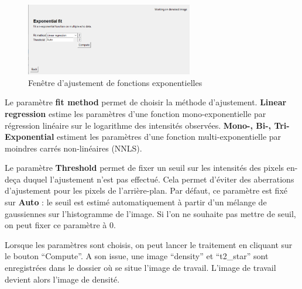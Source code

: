 \documentclass[french]{article}
\begin{document}
\begin{figure}[ht]
  \centering \includegraphics[width=0.65\textwidth]{fig/expfit}
  \caption{Fenêtre d'ajustement de fonctions exponentielles}
  \label{fig:expfit}
\end{figure}



Le paramètre \textbf{fit method} permet de choisir la méthode
d'ajustement. \textbf{Linear regression} estime les paramètres d'une
fonction mono-exponentielle par régression linéaire sur le logarithme
des intensités observées. \textbf{Mono-, Bi-, Tri- Exponential}
estiment les paramètres d'une fonction multi-exponentielle par
moindres carrés non-linéaires (NNLS).

Le paramètre \textbf{Threshold} permet de fixer un seuil sur les
intensités des pixels en-deça duquel l'ajustement n'est pas effectué.
Cela permet d'éviter des aberrations d'ajustement pour les pixels de
l'arrière-plan. Par défaut, ce paramètre est fixé sur \textbf{Auto} :
le seuil est estimé automatiquement à partir d'un mélange de
gaussiennes sur l'histogramme de l'image. Si l'on ne souhaite pas
mettre de seuil, on peut fixer ce paramètre à 0. 

Lorsque les paramètres sont choisis, on peut lancer le traitement en
cliquant sur le bouton ``Compute''. A son issue, une image ``density'' et
``t2\_star'' sont enregistrées dans le dossier où se
situe l'image de travail. L'image de travail devient alors l'image de
densité.



\end{document}
